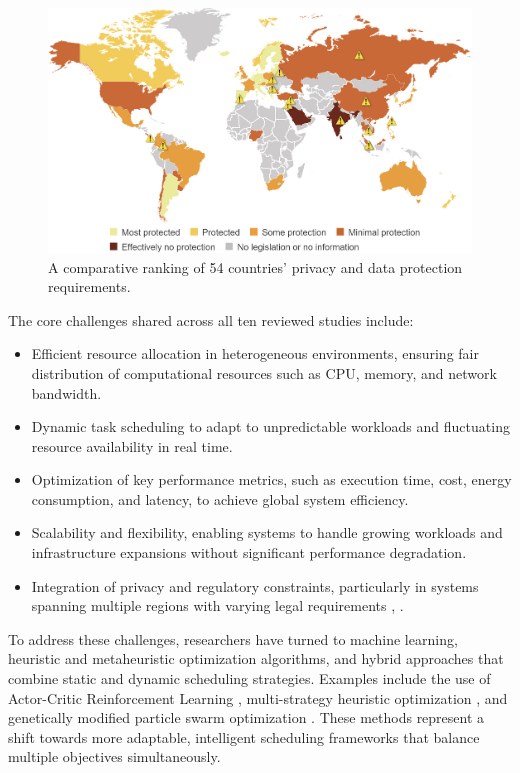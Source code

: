 \documentclass[a4paper, final]{article}
\begin{document}
\begin{figure}[H]
   \centering
   \includegraphics[scale=1.5]{privacy.jpg}
   \caption{A comparative ranking of 54 countries’ privacy and data protection requirements.}
   \label{fig:privacy}
\end{figure}

The core challenges shared across all ten reviewed studies include:

\begin{itemize}
\item Efficient resource allocation in heterogeneous environments, ensuring fair distribution of computational resources 
such as CPU, memory, and network bandwidth.
\item Dynamic task scheduling to adapt to unpredictable workloads and fluctuating resource availability in real time.
\item Optimization of key performance metrics, such as execution time, cost, energy consumption, and latency, to achieve 
global system efficiency.
\item Scalability and flexibility, enabling systems to handle growing workloads and infrastructure expansions without 
significant performance degradation.
\item Integration of privacy and regulatory constraints, particularly in systems spanning multiple regions with varying 
legal requirements \cite{bib:7_ppps}, \cite{bib:10}.
\end{itemize}

To address these challenges, researchers have turned to machine learning, heuristic and metaheuristic optimization 
algorithms, and hybrid approaches that combine static and dynamic scheduling strategies. Examples include the use of 
Actor-Critic Reinforcement Learning \cite{bib:1_acrl}, multi-strategy heuristic optimization \cite{bib:3_sandcat}, and 
genetically modified particle swarm optimization \cite{bib:10}. These methods represent a shift towards more adaptable, 
intelligent scheduling frameworks that balance multiple objectives simultaneously.
\end{document}

